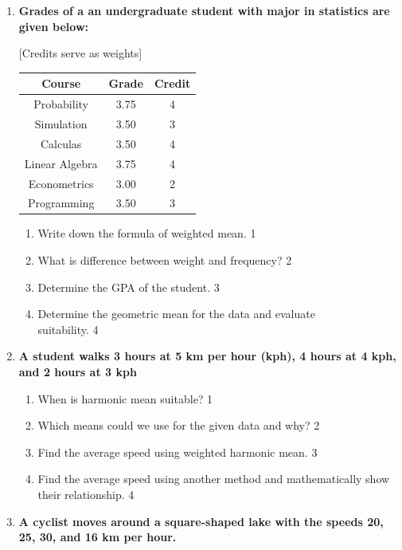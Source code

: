 \documentclass[a4paper,oneside]{book}
\begin{document}
\begin{enumerate}
   \item
	  \textbf{Grades of a an undergraduate student with major in statistics are given below: } 
	  
	  [Credits serve as weights]

\begin{table}[h]
\centering
\begin{tabular}{c|c|c}
\hline
Course & Grade & Credit \\ \hline
Probability & 3.75 & 4 \\ 
Simulation & 3.50 & 3 \\ 
Calculas & 3.50 & 4 \\ 
Linear Algebra & 3.75 & 4 \\ 
Econometrics & 3.00 & 2 \\ 
Programming & 3.50 & 3 \\ \hline
\end{tabular}
\end{table}

  
  \begin{enumerate}
    \item
	Write down the formula of weighted mean. \hfill 1
    \item
	What is difference between weight and frequency? \hfill 2
    \item  
	Determine the GPA of the student. \hfill 3
    \item
	Determine the geometric mean for the data and evaluate \\ suitability. \hfill 4
  \end{enumerate}

 \item
	  \textbf{A student walks 3 hours at 5 km per hour (kph), 4 hours at 4 kph, and 2 hours at 3 kph} 
  
  \begin{enumerate}
    \item
	When is harmonic mean suitable? \hfill 1
    \item
	Which means could we use for the given data and why? \hfill 2
    \item  
	Find the average speed using weighted harmonic mean. \hfill 3
    \item
	Find the average speed using another method and mathematically show their relationship. \hfill 4
  \end{enumerate}

 \item
	  \textbf{A cyclist moves around a square-shaped lake with the speeds 20, 25, 30, and 16 km per hour.} 
  

\end{enumerate}
\end{document}
